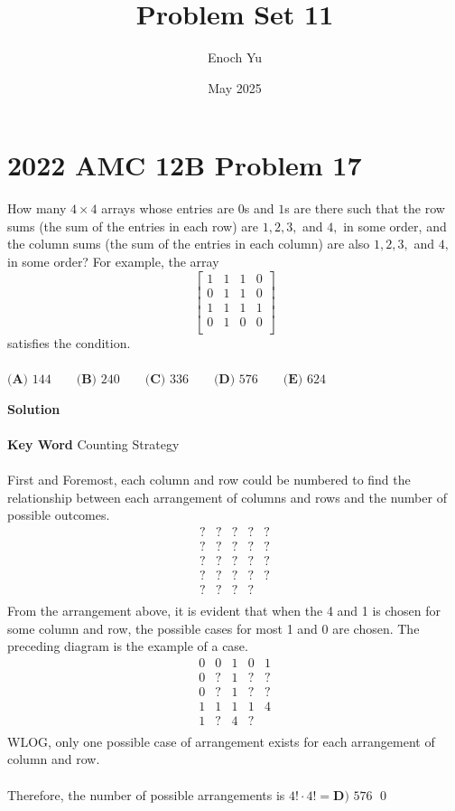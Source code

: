 \documentclass{article}
\title{Problem Set 11}
\author{Enoch Yu}
\date{May 2025}
\newenvironment{solution}{\begin{trivlist}\item[]{\bf Solution}}{\qed \end{trivlist}}
\begin{document}
\section*{2022 AMC 12B Problem 17}
How many $4 \times 4$ arrays whose entries are $0$s and $1$s are there such that the row sums (the sum of the entries in each row) are $1, 2, 3,$ and $4,$ in some order, and the column sums (the sum of the entries in each column) are also $1, 2, 3,$ and $4,$ in some order? For example, the array
\[\left[
\begin{array}{cccc}
    1 & 1 & 1 & 0 \\
    0 & 1 & 1 & 0 \\
    1 & 1 & 1 & 1 \\
    0 & 1 & 0 & 0 \\
\end{array}
\right]\]
satisfies the condition.
\\\\
$\textbf{(A) }144 \qquad \textbf{(B) }240 \qquad \textbf{(C) }336 \qquad \textbf{(D) }576 \qquad \textbf{(E) }624$
\begin{solution}
\\\\
\textbf{Key Word} Counting Strategy
\\\\
First and Foremost, each column and row could be numbered to find the relationship between each arrangement of columns and rows and the number of possible outcomes.
\[
\begin{array}{cccc|c}
    ? & ? & ? & ? & ? \\
    ? & ? & ? & ? & ? \\
    ? & ? & ? & ? & ? \\
    ? & ? & ? & ? & ? \\
    \hline
    ? & ? & ? & ? & \\
\end{array}
\]
From the arrangement above, it is evident that when the 4 and 1 is chosen for some column and row, the possible cases for most 1 and 0 are chosen. The preceding diagram is the example of a case.
\[
\begin{array}{cccc|c}
    0 & 0 & 1 & 0 & 1 \\
    0 & ? & 1 & ? & ? \\
    0 & ? & 1 & ? & ? \\
    1 & 1 & 1 & 1 & 4 \\
    \hline
    1 & ? & 4 & ? & \\
\end{array}
\]
WLOG, only one possible case of arrangement exists for each arrangement of column and row.
\\\\
Therefore, the number of possible arrangements is $4!\cdot4!=\boxed{\textbf{D) }576}$
\end{solution}
\end{document}
